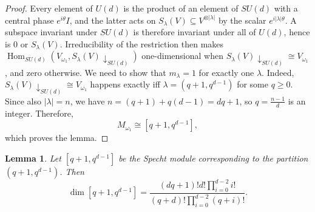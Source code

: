 \documentclass[11pt,letterpaper]{article}
\theoremstyle{plain}
\theoremstyle{plain}
\theoremstyle{plain}
\theoremstyle{plain}
\theoremstyle{plain}
\theoremstyle{plain}
\theoremstyle{plain}
\newtheorem{smlemma}[smtheorem]{Lemma}
\theoremstyle{definition}
\theoremstyle{plain}
\begin{document}
\begin{proof}
    Every element of $U(d)$ is the product of an element of $SU(d)$ with a central phase $e^{i\theta}I$, and the latter acts on $S_\lambda(V)\subseteq V^{\otimes|\lambda|}$ 
    by the scalar $e^{i|\lambda|\theta}$. A subspace invariant under $SU(d)$ is therefore invariant under all of $U(d)$, hence is $0$ or $S_\lambda(V)$. 
    Irreducibility of the restriction then makes $\operatorname{Hom}_{SU(d)}(V_{\omega_1},S_\lambda(V)\downarrow_{SU(d)})$ one-dimensional when $S_\lambda(V)\downarrow_{SU(d)}\cong V_{\omega_1}$, and zero otherwise.
    We need to show that $m_\lambda=1$ for exactly one $\lambda$. Indeed,
    $S_\lambda(V) \downarrow_{S U(d)} \cong V_{\omega_1}$ happens exactly iff $\lambda=\left(q+1, q^{d-1}\right)$ for some $q\geq 0$.
    Since also $|\lambda|=n$, we have $n=(q+1)+q(d-1)=d q+1$, so $q=\frac{n-1}{d}$ is an integer. 
    Therefore,
    \[
        M_{\omega_1} \cong\left[q+1, q^{d-1}\right],
    \]
    which proves the lemma.
\end{proof}

\begin{smlemma}\label{lem:dimension_formula}
    Let $[q+1, q^{d-1}]$ be the Specht module corresponding to the partition $(q+1, q^{d-1})$. Then
    \[
        \operatorname{dim} [q+1, q^{d-1}] = \frac{(d q+1)!d!\prod_{i=0}^{d-2} i!}{(q+d)!\prod_{i=0}^{d-2}(q+i)!}.
    \]
\end{smlemma}
\end{document}
